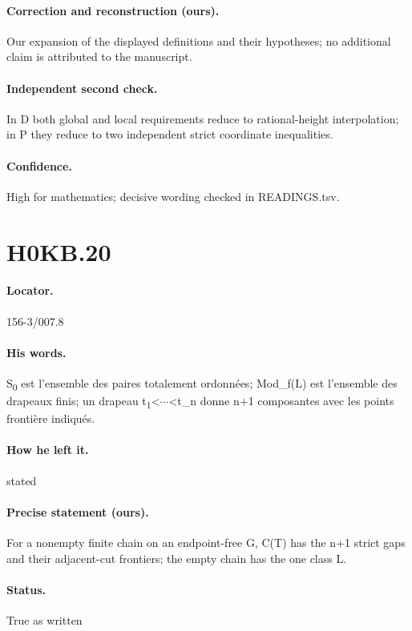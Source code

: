 \paragraph{Correction and reconstruction (ours).} Our expansion of the displayed definitions and their hypotheses; no additional claim is attributed to the manuscript.

\paragraph{Independent second check.} In D both global and local requirements reduce to rational-height interpolation; in P they reduce to two independent strict coordinate inequalities.

\paragraph{Confidence.} High for mathematics; decisive wording checked in READINGS.tsv.

\section*{H0KB.20}\label{statement:H0KB.20}
\paragraph{Locator.} 156-3/007.8

\paragraph{His words.} S\textsubscript{0} est l’ensemble des paires totalement ordonnées; Mod\_f(L) est l’ensemble des drapeaux finis; un drapeau t\textsubscript{1}<\ensuremath{\cdots}<t\_n donne n+1 composantes avec les points frontière indiqués.

\paragraph{How he left it.} stated

\paragraph{Precise statement (ours).} For a nonempty finite chain on an endpoint-free G, C(T) has the n+1 strict gaps and their adjacent-cut frontiers; the empty chain has the one class L.

\paragraph{Status.} True as written

